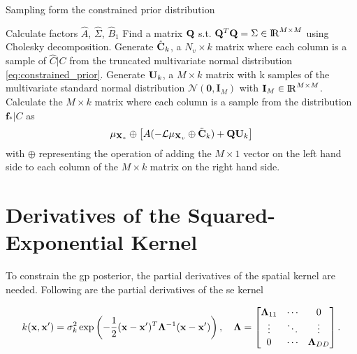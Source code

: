 \begin{algorithm}[h]
\centering
\caption{Sampling form the constrained prior distribution}
\begin{algorithmic}[1]
\Require Calculate factors $\hat{A}$, $\hat{\Sigma}$, $\hat{B}_1$
\State Find a matrix $\mathrm{\mathbf{Q}}$ s.t. $\mathrm{\mathbf{Q}}^T \mathrm{\mathbf{Q}} = \Sigma \in \mathrm{I\!R}^{M \times M}$ using Cholesky decomposition.
\State Generate $\hat{\mathrm{\mathbf{C}}}_k$, a $N_v \times k$ matrix where each column is a sample of $\hat{C} | C$ from the truncated multivariate normal distribution \eqref{eq:constrained_prior}.
\State Generate $\mathrm{\mathbf{U}}_k$, a $M \times k$ matrix with k samples of the multivariate standard normal distribution $\mathcal{N}(\mathbf{0}, \mathbf{I}_M)$ with $\mathbf{I}_M \in \mathrm{I\!R}^{M \times M}$.
\State Calculate the $M \times k$ matrix where each column is a sample from the distribution $\mathbf{f_*} | C$ as
\begin{equation}
    \mu_{ \mathbf{X}_*} \oplus \left[A(- \mathcal{L}\mu_{ \mathbf{X}_v} \oplus \tilde{\mathrm{\mathbf{C}}}_k) +  \mathrm{\mathbf{Q}}\mathrm{\mathbf{U}}_k \right]
\end{equation}
with $\oplus$ representing the operation of adding the $M \times 1$ vector on the left hand side to each column of the $M\times k$ matrix on the right hand side.
\end{algorithmic}
\label{algo:constrained_prior}
\end{algorithm}

\section{Derivatives of the Squared-Exponential Kernel}
\label{apx:derivatives}

To constrain the \gls{gp} posterior, the partial derivatives of the spatial kernel are needed. Following are the partial derivatives of the \gls{se} kernel

\begin{equation}
    k(\mathbf{x}, \mathbf{x}') = \sigma_k^2 \exp\left(-\frac{1}{2} (\mathbf{x} - \mathbf{x}')^T \MatBold{\Lambda}^{-1} (\mathbf{x} - \mathbf{x}')\right), \quad \MatBold{\Lambda} = \begin{bmatrix*}[c]
                            \MatBold{\Lambda}_{11} &  \cdots & 0\\
                            \vdots & \ddots & \vdots\\
                            0 &  \cdots & \MatBold{\Lambda}_{DD}
                        \end{bmatrix*}.
\end{equation}


